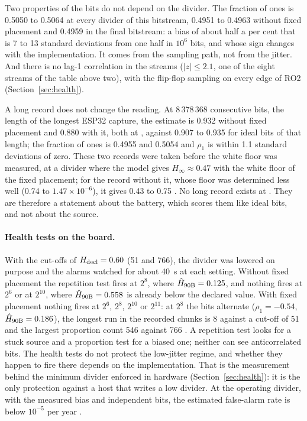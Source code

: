 Two properties of the bits do not depend on the divider. The fraction of
ones is 0.5050 to 0.5064 at every divider of this bitstream, 0.4951 to
0.4963 without fixed placement and 0.4959 in the final bitstream: a bias
of about half a per cent that is 7 to 13 standard deviations from one
half in $10^6$ bits, and whose sign changes with the implementation. It
comes from the sampling path, not from the jitter. And there is no lag-1
correlation in the streams ($|z| \le 2.1$, one of the eight streams of
the table above two), with the flip-flop sampling on every edge of RO2
(Section~\ref{sec:health}).

A long record does not change the reading. At 8\,378\,368 consecutive
bits, the length of the longest ESP32 capture, the estimate is 0.932
without fixed placement and 0.880 with it, both at , against 0.907
to 0.935 for ideal bits of that length; the fraction of ones is 0.4955
and 0.5054 and $\rho_1$ is within 1.1 standard deviations of zero. These
two records were taken before the white floor was measured, at a divider
where the model gives $H_\infty \approx 0.47$ with the white floor of the
fixed placement; for the record without it, whose floor was determined
less well (0.74 to $1.47\times10^{-6}$), it gives 0.43 to 0.75 \est{}.
No long record exists at
. They are therefore a statement about the battery, which scores
them like ideal bits, and not about the source.

\paragraph{Health tests on the board.} With the cut-offs of
$H_{\mathrm{decl}} = 0.60$ (51 and 766), the divider was lowered on purpose and the
alarms watched for about 40~s at each setting. Without fixed placement
the repetition test fires at $2^{8}$, where $\hat{H}_{\mathrm{90B}} = 0.125$, and nothing
fires at $2^{6}$ or at $2^{10}$, where $\hat{H}_{\mathrm{90B}} = 0.558$ is already below
the declared value. With fixed placement nothing fires at $2^{6}$,
$2^{8}$, $2^{10}$ or $2^{11}$: at $2^{8}$ the bits alternate
($\rho_1 = -0.54$, $\hat{H}_{\mathrm{90B}} = 0.186$), the longest run in the recorded
chunks is 8 against a cut-off of 51 and the largest proportion count 546
against 766 \meas{}. A repetition test looks for a stuck source and a
proportion test for a biased one; neither can see anticorrelated bits.
The health tests do not protect the low-jitter regime, and whether they
happen to fire there depends on the implementation. That is the
measurement behind the minimum divider enforced in hardware
(Section~\ref{sec:health}): it is the only protection against a host
that writes a low divider. At the operating divider, with the measured
bias and independent bits, the estimated false-alarm rate is below
$10^{-5}$ per year \est{}.

